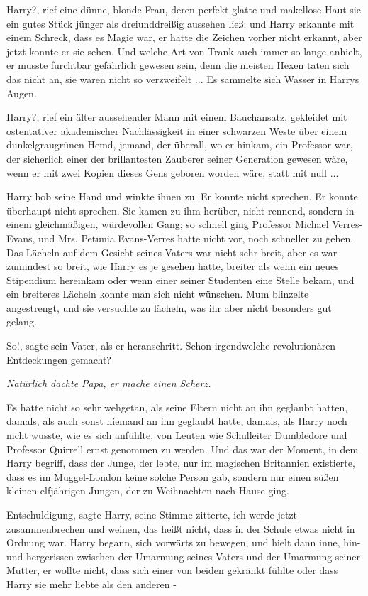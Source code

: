 \glqq{}Harry?\grqq{}, rief eine dünne, blonde Frau, deren perfekt glatte und
makellose Haut sie ein gutes Stück jünger als dreiunddreißig aussehen ließ; und
Harry erkannte mit einem Schreck, dass es Magie war, er hatte die Zeichen vorher
nicht erkannt, aber jetzt konnte er sie sehen. Und welche Art von Trank auch
immer so lange anhielt, er musste furchtbar gefährlich gewesen sein, denn die
meisten Hexen taten sich das nicht an, sie waren nicht so verzweifelt ... Es
sammelte sich Wasser in Harrys Augen.

\glqq{}Harry?\grqq{}, rief ein älter aussehender Mann mit einem Bauchansatz,
gekleidet mit ostentativer akademischer Nachlässigkeit in einer schwarzen Weste
über einem dunkelgraugrünen Hemd, jemand, der überall, wo er hinkam, ein
Professor war, der sicherlich einer der brillantesten Zauberer seiner Generation
gewesen wäre, wenn er mit zwei Kopien dieses Gens geboren worden wäre, statt mit
null ...

Harry hob seine Hand und winkte ihnen zu. Er konnte nicht sprechen. Er konnte
überhaupt nicht sprechen. Sie kamen zu ihm herüber, nicht rennend, sondern in
einem gleichmäßigen, würdevollen Gang; so schnell ging Professor Michael
Verres-Evans, und Mrs. Petunia Evans-Verres hatte nicht vor, noch schneller zu
gehen. Das Lächeln auf dem Gesicht seines Vaters war nicht sehr breit, aber es
war zumindest so breit, wie Harry es je gesehen hatte, breiter als wenn ein
neues Stipendium hereinkam oder wenn einer seiner Studenten eine Stelle bekam,
und ein breiteres Lächeln konnte man sich nicht wünschen. Mum blinzelte
angestrengt, und sie versuchte zu lächeln, was ihr aber nicht besonders gut
gelang.

\glqq{}So!\grqq{}, sagte sein Vater, als er heranschritt. \glqq{}Schon
irgendwelche revolutionären Entdeckungen gemacht?\grqq{}

\emph{Natürlich dachte Papa, er mache einen Scherz.}

Es hatte nicht so sehr wehgetan, als seine Eltern nicht an ihn geglaubt hatten,
damals, als auch sonst niemand an ihn geglaubt hatte, damals, als Harry noch
nicht wusste, wie es sich anfühlte, von Leuten wie Schulleiter Dumbledore und
Professor Quirrell ernst genommen zu werden. Und das war der Moment, in dem
Harry begriff, dass der Junge, der lebte, nur im magischen Britannien
existierte, dass es im Muggel-London keine solche Person gab, sondern nur einen
süßen kleinen elfjährigen Jungen, der zu Weihnachten nach Hause ging.

\glqq{}Entschuldigung\grqq{}, sagte Harry, seine Stimme zitterte, \glqq{}ich werde
jetzt zusammenbrechen und weinen, das heißt nicht, dass in der Schule etwas
nicht in Ordnung war.\grqq{} Harry begann, sich vorwärts zu bewegen, und hielt dann
inne, hin- und hergerissen zwischen der Umarmung seines Vaters und der Umarmung
seiner Mutter, er wollte nicht, dass sich einer von beiden gekränkt fühlte oder
dass Harry sie mehr liebte als den anderen -

